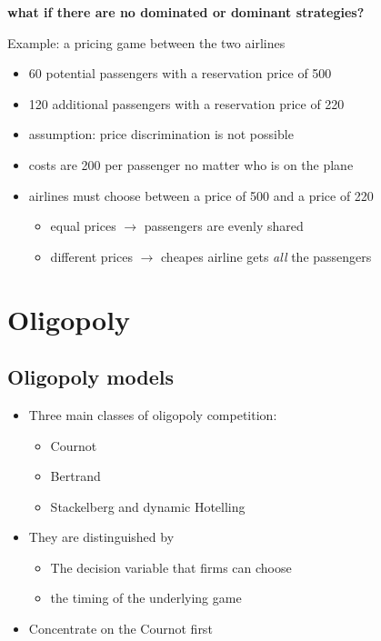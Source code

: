 \documentclass[10pt]{article}
\begin{document}
\newpage

\textbf{what if there are no dominated or dominant strategies?}

\hfill 

Example: a pricing game between the two airlines 
\begin{itemize}
    \item 60 potential passengers with a reservation price of 500
    \item 120 additional passengers with a reservation price of 220
    \item assumption: price discrimination is not possible
    \\
    \item  costs are 200 per passenger no matter who is on the plane \\
    \item airlines must choose between a price of 500 and a price of 220
    \begin{itemize}
        \item equal prices $\to$ passengers are evenly shared
        \item different prices $\to$ cheapes airline gets \textit{all} the passengers 
    \end{itemize}
\end{itemize}


\section{Oligopoly}

\subsection{Oligopoly models}
\begin{itemize}
    \item Three main classes of oligopoly competition:
    \begin{itemize}
        \item Cournot 
        \item Bertrand
        \item Stackelberg and dynamic Hotelling
    \end{itemize}
    \item They are distinguished by
    \begin{itemize}
        \item The decision variable that firms can choose 
        \item the timing of the underlying game 
    \end{itemize}
    \item Concentrate on the Cournot first
\end{itemize}
\end{document}
